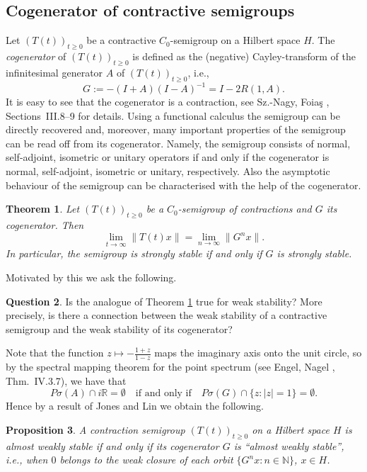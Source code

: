 \documentclass[11pt,intlimits, draft,oneside]{amsart}
\newtheorem{thm}{Theorem}[section]
\newtheorem{prop}[thm]{Proposition}
\theoremstyle{definition}
\newtheorem{question}[thm]{Question}
\def\Psigma{P\sigma}
\def\RR{\mathbb{R}}
\def\NN{\mathbb{N}}
\begin{document}
\subsection{Cogenerator of contractive semigroups}
Let $(T(t))_{t\geq 0}$ be a contractive $C_0$-semigroup on a Hilbert
space $H$. The \emph{cogenerator} of $(T(t))_{t\geq 0}$ is defined
as the (negative) Cayley-transform of the infinitesimal generator
$A$ of $(T(t))_{t\geq 0}$, i.e.,
\begin{equation*}
G:=-(I+A)(I-A)^{-1}=I-2R(1,A).
\end{equation*}
It is easy to see that the cogenerator is a contraction, see
Sz.-Nagy, Foia{\c{s}} \cite{sznagy/foias}, Sections~III.8--9 for
details. Using a functional calculus the semigroup can be directly
recovered and, moreover, many important properties of the semigroup
can be read off from its cogenerator. Namely, the semigroup consists
of normal, self-adjoint, isometric or unitary operators if and only
if the cogenerator is normal, self-adjoint, isometric or unitary,
respectively. Also the asymptotic behaviour of the semigroup can be
characterised with the help of the cogenerator.
\begin{thm}\label{thm:cogen}
Let $(T(t))_{t\geq 0}$ be a $C_0$-semigroup of contractions and $G$
its cogenerator. Then
\begin{equation*}
\lim_{t\to\infty}\|T(t)x\|=\lim_{n\to\infty}\|G^nx\|.
\end{equation*}
In particular, the semigroup is strongly stable if and only if $G$
is strongly stable.
\end{thm}
Motivated by this we ask the following.
\begin{question} Is the analogue of Theorem \ref{thm:cogen} true for weak stability?
More precisely, is there a connection between the weak
stability of a contractive semigroup and the weak stability of its
cogenerator?
\end{question}
Note that the function $z\mapsto-\frac{1+z}{1-z}$ maps the imaginary
axis onto the unit circle, so by the spectral mapping theorem for
the point spectrum (see Engel, Nagel \cite{engel/nagel:2000}, Thm.~IV.3.7), we
have that
\begin{equation*}
\Psigma(A)\cap i\RR=\emptyset\quad\mbox{if and only if}\quad \Psigma
(G)\cap \{z:|z|=1\}=\emptyset.
\end{equation*}
Hence by a result of Jones and Lin \cite{jones/lin:1980} we obtain
the following.
\begin{prop}
A contraction semigroup $(T(t))_{t\geq0}$ on a Hilbert space $H$ is
almost weakly stable if and only if its cogenerator $G$ is ``almost
weakly stable'', i.e., when $0$ belongs to the weak closure of each
orbit $\{G^nx:n\in\NN\}$, $x\in H$.
\end{prop}
%
\end{document}
